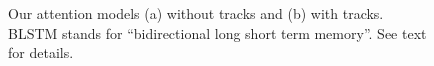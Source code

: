 {\begin{figure}[t!]
\begin{center}
\end{center}
   \caption{Our attention models (a) without tracks and (b) with tracks.
BLSTM stands for ``bidirectional long short term memory''.
See text for details.
}
\label{fig:model}
\end{figure}


}
